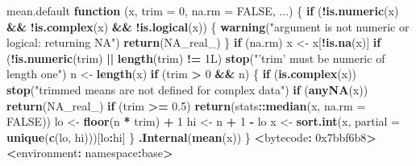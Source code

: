 \documentclass[10pt,a4paper]{book}
\newenvironment{Shaded}{\begin{snugshade}}{\end{snugshade}}
\newcommand{\KeywordTok}[1]{\textcolor[rgb]{0.13,0.29,0.53}{\textbf{#1}}}
\newcommand{\DataTypeTok}[1]{\textcolor[rgb]{0.13,0.29,0.53}{#1}}
\newcommand{\DecValTok}[1]{\textcolor[rgb]{0.00,0.00,0.81}{#1}}
\newcommand{\FloatTok}[1]{\textcolor[rgb]{0.00,0.00,0.81}{#1}}
\newcommand{\StringTok}[1]{\textcolor[rgb]{0.31,0.60,0.02}{#1}}
\newcommand{\OtherTok}[1]{\textcolor[rgb]{0.56,0.35,0.01}{#1}}
\newcommand{\ControlFlowTok}[1]{\textcolor[rgb]{0.13,0.29,0.53}{\textbf{#1}}}
\newcommand{\OperatorTok}[1]{\textcolor[rgb]{0.81,0.36,0.00}{\textbf{#1}}}
\newcommand{\ErrorTok}[1]{\textcolor[rgb]{0.64,0.00,0.00}{\textbf{#1}}}
\newcommand{\NormalTok}[1]{#1}
\begin{document}
\begin{Shaded}
\begin{Highlighting}[]
\NormalTok{mean.default}
\ControlFlowTok{function}\NormalTok{ (x, }\DataTypeTok{trim =} \DecValTok{0}\NormalTok{, }\DataTypeTok{na.rm =} \OtherTok{FALSE}\NormalTok{, ...) }
\NormalTok{\{}
    \ControlFlowTok{if}\NormalTok{ (}\OperatorTok{!}\KeywordTok{is.numeric}\NormalTok{(x) }\OperatorTok{&&}\StringTok{ }\OperatorTok{!}\KeywordTok{is.complex}\NormalTok{(x) }\OperatorTok{&&}\StringTok{ }\OperatorTok{!}\KeywordTok{is.logical}\NormalTok{(x)) \{}
        \KeywordTok{warning}\NormalTok{(}\StringTok{"argument is not numeric or logical: returning NA"}\NormalTok{)}
        \KeywordTok{return}\NormalTok{(}\OtherTok{NA_real_}\NormalTok{)}
\NormalTok{    \}}
    \ControlFlowTok{if}\NormalTok{ (na.rm) }
\NormalTok{        x <-}\StringTok{ }\NormalTok{x[}\OperatorTok{!}\KeywordTok{is.na}\NormalTok{(x)]}
    \ControlFlowTok{if}\NormalTok{ (}\OperatorTok{!}\KeywordTok{is.numeric}\NormalTok{(trim) }\OperatorTok{||}\StringTok{ }\KeywordTok{length}\NormalTok{(trim) }\OperatorTok{!=}\StringTok{ }\NormalTok{1L) }
        \KeywordTok{stop}\NormalTok{(}\StringTok{"'trim' must be numeric of length one"}\NormalTok{)}
\NormalTok{    n <-}\StringTok{ }\KeywordTok{length}\NormalTok{(x)}
    \ControlFlowTok{if}\NormalTok{ (trim }\OperatorTok{>}\StringTok{ }\DecValTok{0} \OperatorTok{&&}\StringTok{ }\NormalTok{n) \{}
        \ControlFlowTok{if}\NormalTok{ (}\KeywordTok{is.complex}\NormalTok{(x)) }
            \KeywordTok{stop}\NormalTok{(}\StringTok{"trimmed means are not defined for complex data"}\NormalTok{)}
        \ControlFlowTok{if}\NormalTok{ (}\KeywordTok{anyNA}\NormalTok{(x)) }
            \KeywordTok{return}\NormalTok{(}\OtherTok{NA_real_}\NormalTok{)}
        \ControlFlowTok{if}\NormalTok{ (trim }\OperatorTok{>=}\StringTok{ }\FloatTok{0.5}\NormalTok{) }
            \KeywordTok{return}\NormalTok{(stats}\OperatorTok{::}\KeywordTok{median}\NormalTok{(x, }\DataTypeTok{na.rm =} \OtherTok{FALSE}\NormalTok{))}
\NormalTok{        lo <-}\StringTok{ }\KeywordTok{floor}\NormalTok{(n }\OperatorTok{*}\StringTok{ }\NormalTok{trim) }\OperatorTok{+}\StringTok{ }\DecValTok{1}
\NormalTok{        hi <-}\StringTok{ }\NormalTok{n }\OperatorTok{+}\StringTok{ }\DecValTok{1} \OperatorTok{-}\StringTok{ }\NormalTok{lo}
\NormalTok{        x <-}\StringTok{ }\KeywordTok{sort.int}\NormalTok{(x, }\DataTypeTok{partial =} \KeywordTok{unique}\NormalTok{(}\KeywordTok{c}\NormalTok{(lo, hi)))[lo}\OperatorTok{:}\NormalTok{hi]}
\NormalTok{    \}}
    \KeywordTok{.Internal}\NormalTok{(}\KeywordTok{mean}\NormalTok{(x))}
\NormalTok{\}}
\OperatorTok{<}\NormalTok{bytecode}\OperatorTok{:}\StringTok{ }\DecValTok{0x7bbf6b8}\OperatorTok{>}
\ErrorTok{<}\NormalTok{environment}\OperatorTok{:}\StringTok{ }\NormalTok{namespace}\OperatorTok{:}\NormalTok{base}\OperatorTok{>}
\end{Highlighting}
\end{Shaded}
\end{document}
